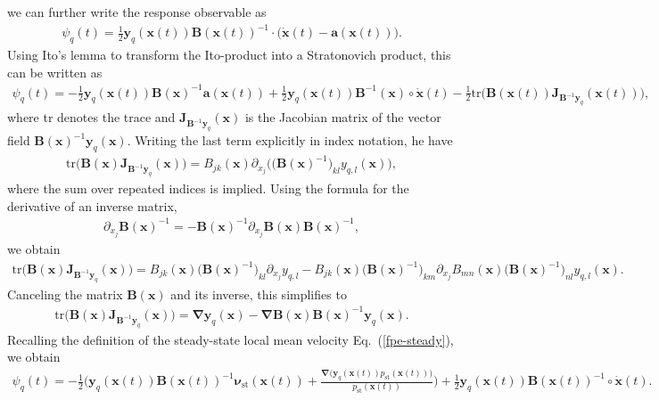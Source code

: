 \documentclass[aps,pre,twocolumn,superscriptaddress,notitlepage]{revtex4-2}
\newcommand{\grad}{\bm{\nabla}}
\renewcommand{\eqref}[1]{Eq.~(\ref{#1})}
\begin{document}
we can further write the response observable as
\begin{align}
\psi_q(t) = \frac{1}{2} \bm{y}_q(\bm{x}(t)) \bm{B}(\bm{x}(t))^{-1} \cdot \big(\dot{\bm{x}}(t) - \bm{a}(\bm{x}(t))\big) .
\end{align}
Using Ito's lemma to transform the Ito-product into a Stratonovich product, this can be written as
\begin{align}
\psi_q(t) = - \frac{1}{2} \bm{y}_q(\bm{x}(t)) \bm{B}(\bm{x})^{-1} \bm{a}(\bm{x}(t)) + \frac{1}{2} \bm{y}_q(\bm{x}(t)) \bm{B}^{-1}(\bm{x}) \circ \dot{\bm{x}}(t) - \frac{1}{2} \text{tr} \Big( \bm{B}(\bm{x}(t)) \bm{J}_{\bm{B}^{-1} \bm{y}_q}(\bm{x}(t)) \Big) ,
\end{align}
where tr denotes the trace and $\bm{J}_{\bm{B}^{-1} \bm{y}_q}(\bm{x})$ is the Jacobian matrix of the vector field $\bm{B}(\bm{x})^{-1} \bm{y}_q(\bm{x})$.
Writing the last term explicitly in index notation, he have
\begin{align}
\text{tr} \Big( \bm{B}(\bm{x}) \bm{J}_{\bm{B}^{-1} \bm{y}_q}(\bm{x}) \Big)  = B_{jk}(\bm{x}) \partial_{x_j} \Big( \big(\bm{B}(\bm{x})^{-1} \big)_{k l} y_{q,l}(\bm{x}) \Big) ,
\end{align}
where the sum over repeated indices is implied.
Using the formula for the derivative of an inverse matrix,
\begin{align}
\partial_{x_j} \bm{B}(\bm{x})^{-1} = - \bm{B}(\bm{x})^{-1} \partial_{x_j} \bm{B}(\bm{x}) \bm{B}(\bm{x})^{-1},
\end{align}
we obtain
\begin{align}
\text{tr} \Big( \bm{B}(\bm{x}) \bm{J}_{\bm{B}^{-1} \bm{y}_q}(\bm{x}) \Big)  = B_{jk}(\bm{x}) \big(\bm{B}(\bm{x})^{-1} \big)_{kl} \partial_{x_j} y_{q,l} - B_{jk}(\bm{x}) \big(\bm{B}(\bm{x})^{-1} \big)_{km} \partial_{x_j} B_{mn}(\bm{x}) \big(\bm{B}(\bm{x})^{-1} \big)_{nl} y_{q,l}(\bm{x}) .
\end{align}
Canceling the matrix $\bm{B}(\bm{x})$ and its inverse, this simplifies to
\begin{align}
\text{tr} \Big( \bm{B}(\bm{x}) \bm{J}_{\bm{B}^{-1} \bm{y}_q}(\bm{x}) \Big) = \grad \bm{y}_q(\bm{x}) - \grad \bm{B}(\bm{x}) \bm{B}(\bm{x})^{-1} \bm{y}_q(\bm{x}) .
\end{align}
Recalling the definition of the steady-state local mean velocity \eqref{fpe-steady}, we obtain
\begin{align}
\psi_q(t) = - \frac{1}{2} \bigg( \bm{y}_q(\bm{x}(t)) \bm{B}(\bm{x}(t))^{-1} \bm{\nu}_\text{st}(\bm{x}(t)) + \frac{\grad \big(\bm{y}_q(\bm{x}(t)) p_\text{st}(\bm{x}(t)) \big)}{p_\text{st}(\bm{x}(t))} \bigg) + \frac{1}{2} \bm{y}_q(\bm{x}(t)) \bm{B}(\bm{x}(t))^{-1} \circ \dot{\bm{x}}(t) .
\end{align}
\end{document}
